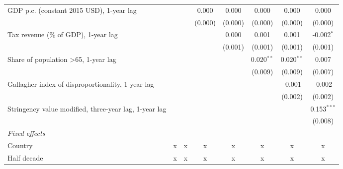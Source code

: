 \begin{table}[htbp]
\begin{tabular}{lccccccc}
      GDP p.c. (constant 2015 USD), 1-year lag                            &                &               & 0.000        & 0.000        & 0.000         & 0.000         & 0.000\\   
                                                                          &                &               & (0.000)      & (0.000)      & (0.000)       & (0.000)       & (0.000)\\   
      Tax revenue (\% of GDP), 1-year lag                                 &                &               &              & 0.000        & 0.001         & 0.001         & -0.002$^{*}$\\   
                                                                          &                &               &              & (0.001)      & (0.001)       & (0.001)       & (0.001)\\   
      Share of population >65, 1-year lag                                 &                &               &              &              & 0.020$^{**}$  & 0.020$^{**}$  & 0.007\\   
                                                                          &                &               &              &              & (0.009)       & (0.009)       & (0.007)\\   
      Gallagher index of disproportionality, 1-year lag                   &                &               &              &              &               & -0.001        & -0.002\\   
                                                                          &                &               &              &              &               & (0.002)       & (0.002)\\   
      Stringency value modified, three-year lag, 1-year lag               &                &               &              &              &               &               & 0.153$^{***}$\\   
                                                                          &                &               &              &              &               &               & (0.008)\\   
      \emph{Fixed effects}\\
      Country                                                             & x              & x             & x            & x            & x             & x             & x\\  
      Half decade                                                         & x              & x             & x            & x            & x             & x             & x\\  

\end{tabular}
\end{table}
